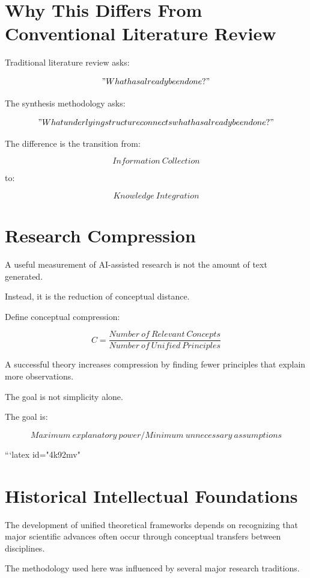 \documentclass[11pt]{article}
\begin{document}
\section{Why This Differs From Conventional Literature Review}


Traditional literature review asks:


\[
"What has already been done?"
\]


The synthesis methodology asks:


\[
"What underlying structure connects what has already been done?"
\]


The difference is the transition from:


\[
Information\ Collection
\]


to:


\[
Knowledge\ Integration
\]



\section{Research Compression}


A useful measurement of AI-assisted research is not the amount of text
generated.


Instead, it is the reduction of conceptual distance.


Define conceptual compression:


\[
C=
\frac{
Number\ of\ Relevant\ Concepts
}
{
Number\ of\ Unified\ Principles
}
\]


A successful theory increases compression by finding fewer principles
that explain more observations.



The goal is not simplicity alone.


The goal is:


\[
Maximum\ explanatory\ power
/
Minimum\ unnecessary\ assumptions
\]

```latex id="4k92mv"
\section{Historical Intellectual Foundations}


The development of unified theoretical frameworks depends on recognizing
that major scientific advances often occur through conceptual transfers
between disciplines.


The methodology used here was influenced by several major research
traditions.
\end{document}
